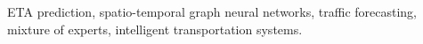 ETA prediction, spatio-temporal graph neural networks, traffic forecasting, mixture of experts, intelligent transportation systems.
